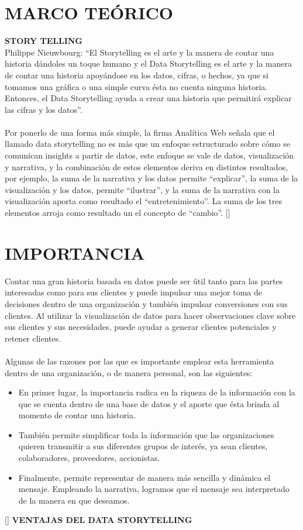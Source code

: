 \documentclass[preprint,12pt]{elsarticle}
\begin{document}
	\section{MARCO TEÓRICO}
	\textbf{ STORY TELLING}\\
	
	Philippe Nieuwbourg: “El Storytelling es el arte y la manera de contar una historia dándoles un toque humano y el Data Storytelling es el arte y la manera de contar una historia apoyándose en los datos, cifras, o hechos, ya que si tomamos una gráfica o una simple curva ésta no cuenta ninguna historia. Entonces, el Data Storytelling ayuda a crear una historia que permitirá explicar las cifras y los datos”. \\
	\\
	Por ponerlo de una forma más simple, la firma Analítica Web señala que el llamado data storytelling no es más que un enfoque estructurado sobre cómo se comunican insights a partir de datos, este enfoque se vale de datos, visualización y narrativa, y la combinación de estos elementos deriva en distintos resultados, por ejemplo, la suma de la narrativa y los datos permite “explicar”, la suma de la visualización y los datos, permite “ilustrar”, y la suma de la narrativa con la visualización aporta como resultado el “entretenimiento”. La suma de los tres elementos arroja como resultado un el concepto de “cambio”. []\\

\section{IMPORTANCIA}
	
	Contar una gran historia basada en datos puede ser útil tanto para las partes interesadas como para sus clientes y puede impulsar una mejor toma de decisiones dentro de una organización y también impulsar conversiones con sus clientes. Al utilizar la visualización de datos para hacer observaciones clave sobre sus clientes y sus necesidades, puede ayudar a generar clientes potenciales y retener clientes.\\
	\\
	Algunas de las razones por las que es importante emplear esta herramienta dentro de una organización, o de manera personal, son las siguientes:
	
	\begin{itemize}
		\item En primer lugar, la importancia radica en la riqueza de la información con la que se cuenta dentro de una base de datos y el aporte que ésta brinda al momento de contar una historia.
		\item También permite simplificar toda la información que las organizaciones quieren transmitir a sus diferentes grupos de interés, ya sean clientes, colaboradores, proveedores, accionistas.
		\item Finalmente, permite representar de manera más sencilla y dinámica el mensaje. Empleando la narrativa, logramos que el mensaje sea interpretado de la manera en que deseamos.
	\end{itemize}
	[]
	\textbf{VENTAJAS DEL DATA STORYTELLING}\\
	
\end{document}
